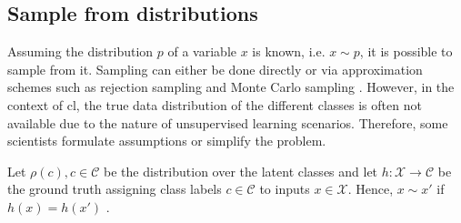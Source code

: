 
\subsection{Sample from distributions}
\label{subsec:SampleViaDistribution}

Assuming the distribution $p$ of a variable $x$ is known, i.e. $x \sim p$, it is possible to sample from it.
Sampling can either be done directly or 
via approximation schemes such as rejection sampling and Monte Carlo sampling \citet{robinson_contrastive_2021}.
However, in the context of \ac{cl}, the true data distribution of the different classes is often not available 
due to the nature of unsupervised learning scenarios.
Therefore, some scientists formulate assumptions or simplify the problem.

Let $\rho(c), c \in \mathcal{C}$ be the distribution over the latent classes and 
let $h: \mathcal{X} \rightarrow \mathcal{C}$ be the ground truth assigning class labels $c \in \mathcal{C}$ to inputs $x \in \mathcal{X}$.
Hence, $x \sim x'$ if $h(x) = h(x')$ \citet{robinson_contrastive_2021,chuang_debiased_2020}.








